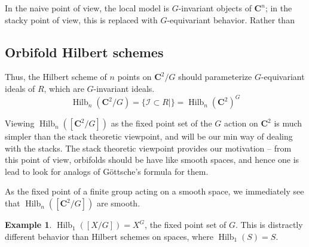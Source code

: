 \documentclass{amsart}[12pt]
\theoremstyle{definition}
\newtheorem{example}[dummy]{Example}
\newcommand{\C}{\mathbf{C}}
\DeclareMathOperator{\Hilb}{Hilb}
\begin{document}
In the naive point of view, the local model is $G$-invariant objects of $\C^n$; in the stacky point of view, this is replaced with $G$-equivariant behavior.  Rather than 



\subsection{Orbifold Hilbert schemes}




Thus, the Hilbert scheme of $n$ points on $\C^2/G$ should parameterize $G$-equivariant ideals of $R$, which are $G$-invariant ideals.  
$$\Hilb_n(\C^2/G)=\{\mathcal{I}\subset R | \} =\Hilb_n(\C^2)^G$$

Viewing $\Hilb_n([\C^2/G])$ as the fixed point set of the $G$ action on $\C^2$ is much simpler than the stack theoretic viewpoint, and will be our min way of dealing with the stacks.  The stack theoretic viewpoint provides our motivation -- from this point of view, orbifolds should be have like smooth spaces, and hence one is lead to look for analogs of G\"ottsche's formula for them.


As the fixed point of a finite group acting on a smooth space, we immediately see that $\Hilb_n([\C^2/G])$ are smooth.



\begin{example}
$\Hilb_1([X/G])=X^G$, the fixed point set of $G$.  This is distractly different behavior than Hilbert schemes on spaces, where $\Hilb_1(S)=S$.
\end{example}
\end{document}
